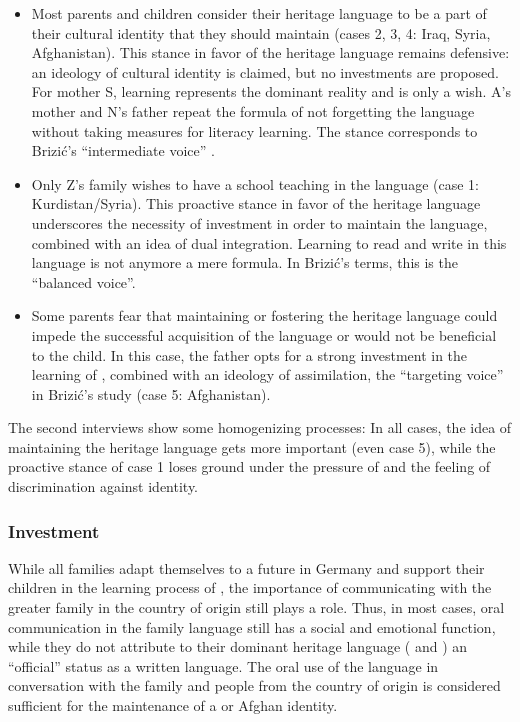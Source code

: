 \documentclass[output=paper,colorlinks,citecolor=brown]{langscibook}
\begin{document}
\begin{itemize}
        \item Most parents and children consider their heritage language to be a part of their cultural identity that they should maintain (cases 2, 3, 4: Iraq, Syria, Afghanistan). This stance in favor of the heritage language remains defensive: an ideology of cultural identity is claimed, but no investments are proposed. For mother S, learning  represents the dominant reality and  is only a wish. A's mother and N's father repeat the formula of not forgetting the language without taking measures for literacy learning. The stance corresponds to Brizić's ``intermediate voice'' \citep{brizic2021}.
        \item Only Z's family wishes to have a school teaching in the   language (case 1: Kurdistan/Syria). This proactive stance in favor of the heritage language underscores the necessity of investment in order to maintain the language, combined with an idea of dual integration. Learning to read and write in this language is not anymore a mere formula. In Brizić's terms, this is the ``balanced voice''.
%
        \item Some parents fear that maintaining or fostering the heritage language could impede the successful acquisition of the  language or would not be beneficial to the child. In this case, the father opts for a strong investment in the learning of , combined with an ideology of assimilation, the ``targeting voice'' in Brizić's study (case 5: Afghanistan).
%
\end{itemize}
    
The second interviews show some homogenizing processes: In all cases, the idea of maintaining the heritage language gets more important (even case 5), while the proactive stance of case 1 loses ground under the pressure of  and the feeling of discrimination against  identity.
    
\subsubsection{Investment}
While all families adapt themselves to a future in Germany and support their children in the learning process of , the importance of communicating with the greater family in the country of origin still plays a role. Thus, in most cases, oral communication in the family language still has a social and emotional function, while they do not attribute to their dominant heritage language ( and ) an ``official'' status as a written language. The oral use of the language in conversation with the family and people from the country of origin is considered sufficient for the maintenance of a  or Afghan identity.
    
\end{document}

